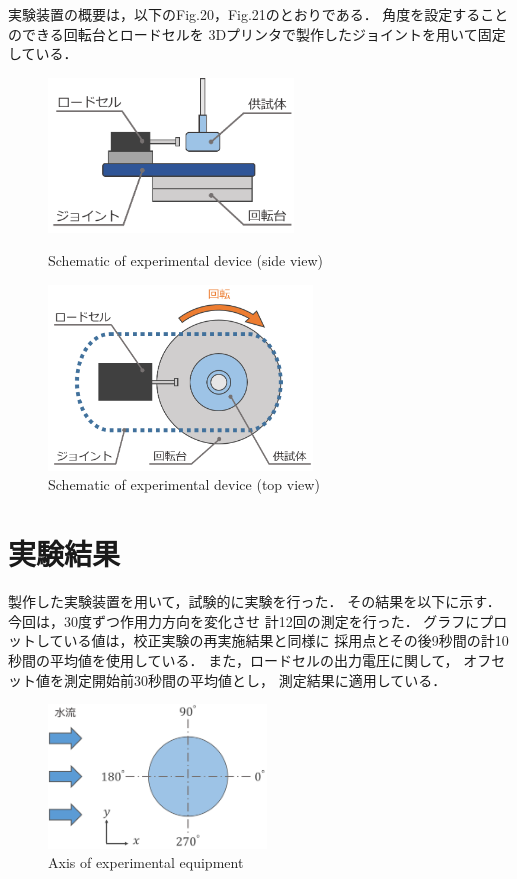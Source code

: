 \documentclass[twocolumn,a4j]{jsarticle}
\begin{document}
実験装置の概要は，以下のFig.20，Fig.21のとおりである．
角度を設定することのできる回転台とロードセルを
3Dプリンタで製作したジョイントを用いて固定している．

\begin{figure}[htbp]
    \footnotesize
    \begin{center}
        \includegraphics[width=65mm]{../images/rotation.png}
        \caption{Schematic of experimental device (side view)}
        \includegraphics[width=70mm]{../images/rotation_2.png}
        \caption{Schematic of experimental device (top view)}
    \end{center}
\end{figure}

\newpage

\section{実験結果}
製作した実験装置を用いて，試験的に実験を行った．
その結果を以下に示す．
今回は，30度ずつ作用力方向を変化させ
計12回の測定を行った．
グラフにプロットしている値は，校正実験の再実施結果と同様に
採用点とその後9秒間の計10秒間の平均値を使用している．
また，ロードセルの出力電圧に関して，
オフセット値を測定開始前30秒間の平均値とし，
測定結果に適用している．

\begin{figure}[htbp]
    \footnotesize
    \begin{center}
        \includegraphics[width=58mm]{../images/model_1.png}
        \caption{Axis of experimental equipment}
    \end{center}
\end{figure}
\end{document}
